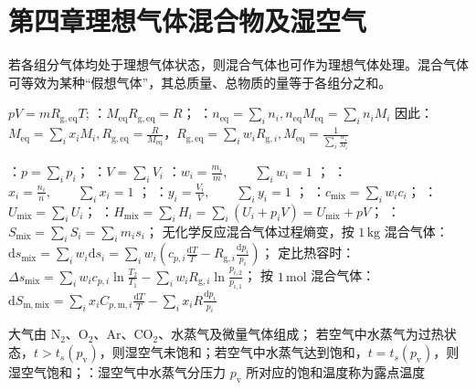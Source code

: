 \section{第四章\quad 理想气体混合物及湿空气}

若各组分气体均处于理想气体状态，则混合气体也可作为理想气体处理。混合气体可等效为某种“假想气体”，其总质量、总物质的量等于各组分之和。

 $pV=mR_{\mathrm{g,eq}}T$;
：$M_{\mathrm{eq}}R_{\mathrm{g,eq}}=R$；
：$n_{\mathrm{eq}}=\sum_i n_i,n_{\mathrm{eq}}M_{\mathrm{eq}}=\sum_i n_iM_i$ 因此：$M_{\mathrm{eq}}=\sum_i x_iM_i,R_{\mathrm{g,eq}}=\frac{R}{M_{\mathrm{eq}}}$，$R_{\mathrm{g,eq}}=\sum_i w_iR_{\mathrm{g},i},M_{\mathrm{eq}}=\frac{1}{\sum_i \frac{w_i}{M_i}}$

：$p=\sum_i p_i$；
：$V=\sum_i V_i$
：$w_i=\frac{m_i}{m},\qquad \sum_i w_i=1$ ；
：$x_i=\frac{n_i}{n},\qquad \sum_i x_i=1$ ；
：$y_i=\frac{V_i}{V},\qquad \sum_i y_i=1$ ；
：$c_{\mathrm{mix}}=\sum_i w_ic_i$；
：$U_{\mathrm{mix}}=\sum_i U_i$；
：$H_{\mathrm{mix}}=\sum_iH_i=\sum_i(U_i+p_iV)=U_{\mathrm{mix}}+pV$；
：$S_{\mathrm{mix}}=\sum_iS_i=\sum_i m_is_i$；
无化学反应混合气体过程熵变，按 $1\,\mathrm{kg}$ 混合气体：$\mathrm{d}s_{\mathrm{mix}}=\sum_i w_i\mathrm{d}s_i=\sum_i w_i\left(c_{p,i}\frac{\mathrm{d}T}{T}-R_{\mathrm{g},i}\frac{\mathrm{d}p_i}{p_i}\right)$；
定比热容时：$  \Delta s_{\mathrm{mix}}=\sum_i w_ic_{p,i}\ln\frac{T_2}{T_1}-\sum_i w_iR_{\mathrm{g},i}\ln\frac{p_{i,2}}{p_{i,1}}$；
按 $1\,\mathrm{mol}$ 混合气体：$\mathrm{d}S_{\mathrm{m,mix}}=\sum_i x_iC_{p,\mathrm{m},i}\frac{\mathrm{d}T}{T}-\sum_i x_iR\frac{\mathrm{d}p_i}{p_i}$

\divider

大气由 $\mathrm{N_2}$、$\mathrm{O_2}$、$\mathrm{Ar}$、$\mathrm{CO_2}$、水蒸气及微量气体组成；
若空气中水蒸气为过热状态，$t>t_s(p_{\mathrm{v}})$，则湿空气未饱和；若空气中水蒸气达到饱和，$t=t_s(p_{\mathrm{v}})$，则湿空气饱和；：湿空气中水蒸气分压力 $p_{\mathrm{v}}$ 所对应的饱和温度称为露点温度

\divider
